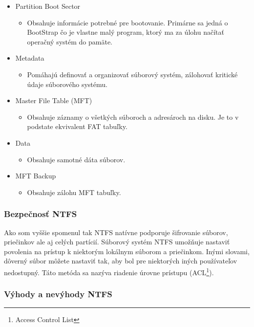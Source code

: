 \documentclass[12pt,oneside,slovak,a4paper]{article}
\begin{document}
\begin{spacing}{1.0}
\begin{itemize}
	\item Partition Boot Sector
		\begin{itemize}
			\item Obsahuje informácie potrebné pre bootovanie. Primárne sa jedná o BootStrap čo je vlastne malý program, ktorý ma za úlohu načítať operačný systém do pamäte.
		\end{itemize}
	\item Metadata
		\begin{itemize}
			\item Pomáhajú definovať a organizovať súborový systém, zálohovať kritické údaje súborového systému.
		\end{itemize}
	\item Master File Table (MFT)
		\begin{itemize}
			\item Obsahuje záznamy o všetkých súboroch a adresároch na disku. Je to v podstate ekvivalent FAT tabuľky.
		\end{itemize}
	\item Data
		\begin{itemize}
			\item Obsahuje samotné dáta súborov.
		\end{itemize}
	\item MFT Backup
		\begin{itemize}
			\item Obsahuje zálohu MFT tabuľky.
		\end{itemize}
\end{itemize}
\end{spacing}

\subsubsection{Bezpečnosť NTFS}
Ako som vyššie spomenul tak NTFS natívne podporuje šifrovanie súborov, priečinkov ale aj celých partícií. Súborový systém NTFS umožňuje nastaviť povolenia na prístup k niektorým lokálnym súborom a priečinkom. Inými slovami, dôverný súbor môžete nastaviť tak, aby bol pre niektorých iných používateľov nedostupný. Táto metóda sa nazýva riadenie úrovne prístupu (ACL\footnote{Access Control List}).

\subsubsection{Výhody a nevýhody NTFS}
\end{document}
